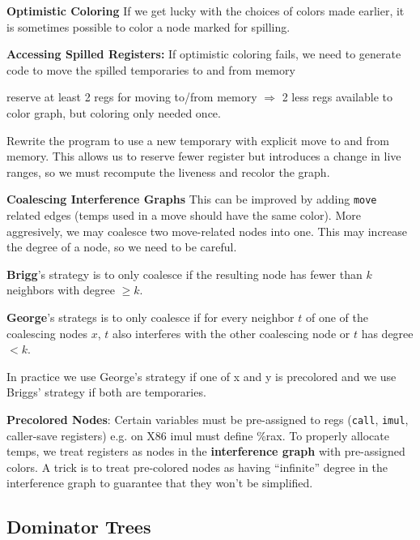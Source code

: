 \textbf{Optimistic Coloring}
If we get lucky with the choices of colors made earlier, it is sometimes possible to color a
node marked for spilling.\medskip

\textbf{Accessing Spilled Registers:}
If optimistic coloring fails, we need to generate code to move the spilled temporaries to and from memory
\begin{compactitem}
    \item reserve at least 2 regs for moving to/from memory $\Rightarrow$ 2 less regs available to color graph, but coloring only needed once.
    \item Rewrite the program to use a new temporary with explicit move to and from memory. This allows us to reserve fewer register but introduces a change in live ranges, so we must recompute the liveness and recolor the graph.
\end{compactitem}\medskip

\textbf{Coalescing Interference Graphs}
This can be improved by adding \texttt{move} related edges (temps used in a move should have the same color). More aggresively, we may coalesce two move-related nodes into one. This may increase the degree of a node, so we need to be careful. \medskip

\textbf{Brigg}'s strategy is to only coalesce if the resulting node has fewer than $k$ neighbors with degree $\geq k$. \medskip

\textbf{George}'s strategs is to only coalesce if for every neighbor $t$ of one of the coalescing nodes $x$, $t$ also interferes with the other coalescing node or $t$ has degree $< k$.\medskip

In practice we use George’s strategy if one of x and y is precolored and we use Briggs’ strategy if both are temporaries. \medskip

\textbf{Precolored Nodes}: Certain variables must be pre-assigned to regs (\texttt{call}, \texttt{imul}, caller-save registers) e.g. on X86 imul must define \%rax. To properly allocate temps, we treat registers as nodes in the \textbf{interference graph} with pre-assigned colors. A trick is to treat pre-colored nodes as having
“infinite” degree in the interference graph to guarantee that they won’t be simplified.



\subsection*{Dominator Trees}


